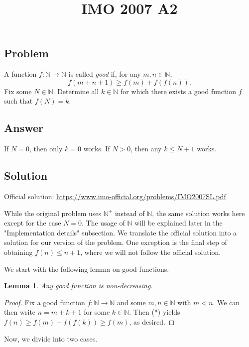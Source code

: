\documentclass{article}
\title{IMO 2007 A2}
\author{}
\date{}
\newcommand{\N}{\mathbb{N}}
\newtheorem{lemma}{Lemma}
\begin{document}
\maketitle



\subsection*{Problem}

A function $f : \N \to \N$ is called \textit{good} if, for any $m, n \in \N$,
\[ f(m + n + 1) \geq f(m) + f(f(n)). \tag{*} \]
Fix some $N \in \N$.
Determine all $k \in \N$ for which there exists a good function $f$ such that $f(N) = k$.



\subsection*{Answer}

If $N = 0$, then only $k = 0$ works.
If $N > 0$, then any $k \leq N + 1$ works.



\subsection*{Solution}

Official solution: \url{https://www.imo-official.org/problems/IMO2007SL.pdf}

While the original problem uses $\N^+$ instead of $\N$, the same solution works here except for the case $N = 0$.
The usage of $\N$ will be explained later in the "Implementation details" subsection.
We translate the official solution into a solution for our version of the problem.
One exception is the final step of obtaining $f(n) \leq n + 1$, where we will not follow the official solution.

We start with the following lemma on good functions.

\begin{lemma}\label{2007a2-1}
Any good function is non-decreasing.
\end{lemma}
\begin{proof}
Fix a good function $f : \N \to \N$ and some $m, n \in \N$ with $m < n$.
We can then write $n = m + k + 1$ for some $k \in \N$.
Then (*) yields $f(n) \geq f(m) + f(f(k)) \geq f(m)$, as desired.
\end{proof}

Now, we divide into two cases.
\end{document}
